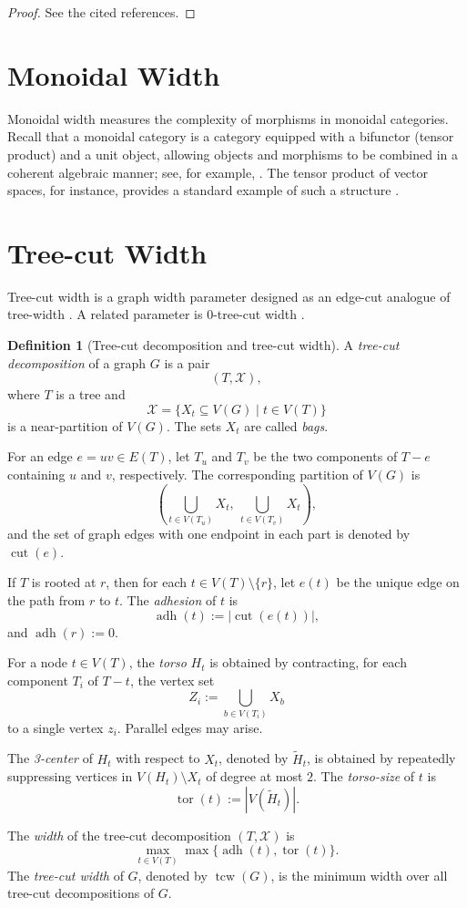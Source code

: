 \documentclass[10pt]{book}
\theoremstyle{definition}
\newtheorem{definition}[theorem]{Definition}
\begin{document}
\begin{proof}
See the cited references.
\end{proof}

\section{Monoidal Width}

Monoidal width \cite{27} measures the complexity of morphisms in monoidal categories.  
Recall that a monoidal category is a category equipped with a bifunctor (tensor product) and a unit object, allowing objects and morphisms to be combined in a coherent algebraic manner; see, for example, \cite{Turaev2017MonoidalCA}.  
The tensor product of vector spaces, for instance, provides a standard example of such a structure \cite{cheng2012introduction,smolensky1990tensor}.

\section{Tree-cut Width}

Tree-cut width is a graph width parameter designed as an edge-cut analogue of tree-width \cite{18}.  
A related parameter is \(0\)-tree-cut width \cite{17}.

\begin{definition}[Tree-cut decomposition and tree-cut width]
\cite{18}
A \emph{tree-cut decomposition} of a graph \(G\) is a pair
\[
(T,\mathcal{X}),
\]
where \(T\) is a tree and
\[
\mathcal{X}=\{X_t\subseteq V(G)\mid t\in V(T)\}
\]
is a near-partition of \(V(G)\). The sets \(X_t\) are called \emph{bags}.

For an edge \(e=uv\in E(T)\), let \(T_u\) and \(T_v\) be the two components of \(T-e\) containing \(u\) and \(v\), respectively.  
The corresponding partition of \(V(G)\) is
\[
\left(\bigcup_{t\in V(T_u)}X_t,\ \bigcup_{t\in V(T_v)}X_t\right),
\]
and the set of graph edges with one endpoint in each part is denoted by \(\operatorname{cut}(e)\).

If \(T\) is rooted at \(r\), then for each \(t\in V(T)\setminus\{r\}\), let \(e(t)\) be the unique edge on the path from \(r\) to \(t\).  
The \emph{adhesion} of \(t\) is
\[
\operatorname{adh}(t):=|\operatorname{cut}(e(t))|,
\]
and \(\operatorname{adh}(r):=0\).

For a node \(t\in V(T)\), the \emph{torso} \(H_t\) is obtained by contracting, for each component \(T_i\) of \(T-t\), the vertex set
\[
Z_i:=\bigcup_{b\in V(T_i)} X_b
\]
to a single vertex \(z_i\). Parallel edges may arise.

The \emph{3-center} of \(H_t\) with respect to \(X_t\), denoted by \(\widetilde{H}_t\), is obtained by repeatedly suppressing vertices in \(V(H_t)\setminus X_t\) of degree at most \(2\).  
The \emph{torso-size} of \(t\) is
\[
\operatorname{tor}(t):=|V(\widetilde{H}_t)|.
\]

The \emph{width} of the tree-cut decomposition \((T,\mathcal{X})\) is
\[
\max_{t\in V(T)} \max\{\operatorname{adh}(t),\operatorname{tor}(t)\}.
\]
The \emph{tree-cut width} of \(G\), denoted by \(\operatorname{tcw}(G)\), is the minimum width over all tree-cut decompositions of \(G\).
\end{definition}
\end{document}

